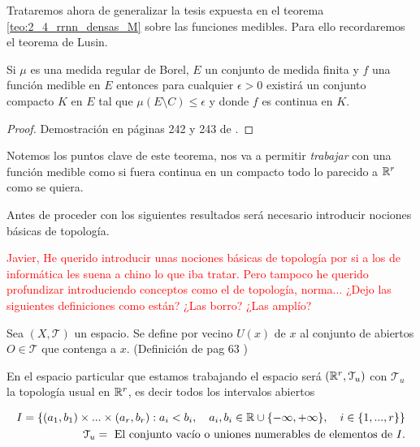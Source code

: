 %

Trataremos ahora de generalizar la tesis expuesta en 
 el teorema \ref{teo:2_4_rrnn_densas_M} sobre las funciones medibles. 
 Para ello recordaremos el teorema de Lusin.
\begin{teorema} \label{teo:Lusin}
    Si $\mu$ es una medida regular de Borel, $E$ un conjunto de medida finita 
    y $f$ una función medible en $E$ entonces
    para cualquier $\epsilon > 0$ existirá un conjunto compacto 
    $K$ en $E$ tal que $\mu(E \setminus C) \leq \epsilon$ y donde $f$ es continua en $K$. 
\end{teorema}
\begin{proof}
    Demostración en páginas 242 y 243 de \cite{nla.cat-vn1819421}.
\end{proof}  

Notemos los puntos clave de este teorema, nos va a permitir \textit{trabajar} con una función medible como si fuera continua en un compacto
todo lo parecido a $\mathbb{R}^r$ como se quiera. 

Antes de proceder con los siguientes resultados será necesario introducir nociones
básicas de topología. 

\textcolor{red}{Javier, He querido introducir unas nociones básicas de topología por si 
a los de informática les suena a chino lo que iba tratar. Pero tampoco he querido profundizar
introduciendo conceptos como el de topología, norma... ¿Dejo las siguientes definiciones como están? 
¿Las borro? ¿Las amplío?
}

\begin{definicion}[Vecino]
    Sea $(X, \mathcal{T})$ un espacio. Se define por vecino $U(x)$  de $x$ al conjunto de abiertos 
    $O \in \mathcal{T}$ que contenga a $x$. (Definición de pag 63 \cite{james1966topology})
\end{definicion}

En el espacio particular que estamos trabajando el espacio será $(\mathbb{R}^r, \mathcal{T}_u)$ con 
$\mathcal{T}_u$ la topología usual en $\mathbb{R}^r$,  es decir todos los intervalos abiertos

\begin{equation}
    \begin{split}
            I = \{ (a_1, b_1) \times ... \times (a_r, b_r) : 
            a_i < b_i,
            \quad
            a_i, b_i \in \mathbb{R} \cup \{-\infty,  +\infty \},
            \quad 
            i \in \{1,..., r\}
        \} 
        \\
        \mathcal{T}_u = \text{ El conjunto vacío o uniones numerables de elementos de } I. 
    \end{split}
\end{equation}

